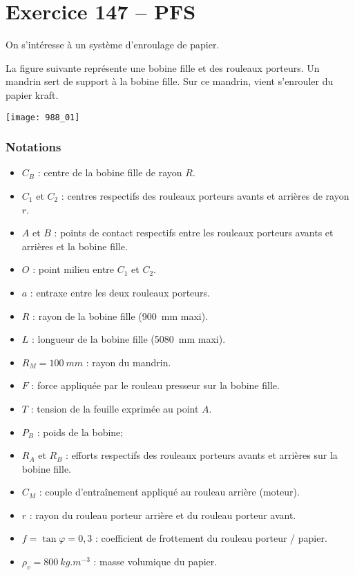 \section*{Exercice 147 -- PFS}
\setcounter{exo}{0}

On s'intéresse à un système d'enroulage de papier.

La figure suivante représente une bobine fille et des rouleaux porteurs.  Un mandrin sert de support à la bobine fille. Sur ce mandrin, vient s'enrouler du papier kraft. 


\begin{center}
\texttt{[image: 988\_01]}%
\end{center}

\subsubsection*{Notations}
\begin{itemize}
\item $C_B$ : centre de la bobine fille de rayon $R$.
\item $C_1$ et $C_2$ : centres respectifs des rouleaux porteurs avants et arrières de rayon $r$.
\item $A$ et $B$ : points de contact respectifs entre les rouleaux porteurs avants et arrières et la bobine fille.
\item $O$ : point milieu entre $C_1$ et $C_2$.
\item $a$ : entraxe entre les deux rouleaux porteurs.
\item $R$ : rayon de la bobine fille (\SI{900}{mm} maxi).
\item $L$ : longueur de la bobine fille (\SI{5080}{mm} maxi).
\item $R_M = \SI{100}{mm}$ : rayon du mandrin.
\item $F$ : force appliquée par le rouleau presseur sur la bobine fille. 
\item $T$ : tension de la feuille exprimée au point $A$.
\item $P_B$ : poids de la bobine;
\item $R_A$ et $R_B$ : efforts respectifs des rouleaux porteurs avants et arrières sur la bobine fille.  
\item $C_M$ : couple d’entraînement appliqué au rouleau arrière (moteur).
\item $r$ : rayon du rouleau porteur arrière et du rouleau porteur avant. 
\item $f=\tan\varphi = 0,3$ : coefficient de frottement du rouleau porteur / papier.  
\item $\rho_v = \SI{800}{kg.m^{-3}}$ : masse volumique du papier.
\end{itemize}

